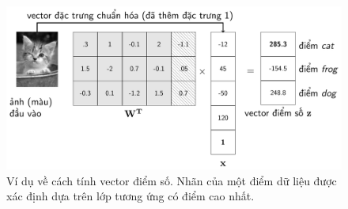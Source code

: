  
 
 
 
 
\begin{figure}[t]
\centering
    \includegraphics[width = .8\textwidth]{Chapters/09_SupportVectorMachines/22_multiclasssvm/latex/scores.pdf}
    \caption[]{Ví dụ về cách tính vector điểm số. Nhãn của một điểm dữ liệu được xác định dựa trên lớp tương ứng có điểm cao nhất.}
    \label{fig:22_5}
\end{figure}
 
 
